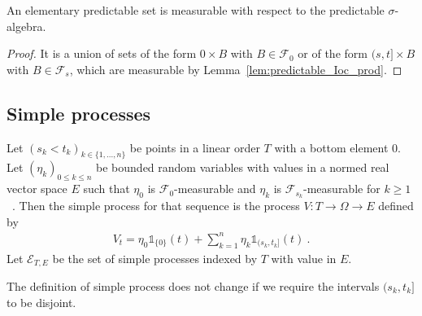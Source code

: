 \begin{lemma}\label{lem:predictableSet_elementaryPredictableSet}
  \leanok
An elementary predictable set is measurable with respect to the predictable $\sigma$-algebra.
\end{lemma}

\begin{proof}
  \leanok
It is a union of sets of the form ${0} \times B$ with $B \in \mathcal{F}_0$ or of the form $(s, t] \times B$ with $B \in \mathcal{F}_s$, which are measurable by Lemma~\ref{lem:predictable_Ioc_prod}.
\end{proof}

\subsection{Simple processes}

\begin{definition}\label{def:simpleProcess}
  \leanok
Let $(s_k < t_k)_{k \in \{1, ..., n\}}$ be points in a linear order $T$ with a bottom element 0.
Let $(\eta_k)_{0 \le k \le n}$ be bounded random variables with values in a normed real vector space $E$ such that $\eta_0$ is $\mathcal{F}_0$-measurable and $\eta_k$ is $\mathcal{F}_{s_k}$-measurable for $k \ge 1$~.
Then the simple process for that sequence is the process $V : T \to \Omega \to E$ defined by
\begin{align*}
  V_t = \eta_0 \mathbb{1}_{\{0\}}(t) + \sum_{k=1}^{n} \eta_k \mathbb{1}_{(s_k, t_k]}(t)
  \: .
\end{align*}
Let $\mathcal{E}_{T, E}$ be the set of simple processes indexed by $T$ with value in $E$.
\end{definition}

\begin{lemma}\label{lem:simpleProcess_admitsDisjointIntervals}
  The definition of simple process does not change if we require the intervals $(s_k, t_k]$ to be disjoint.
\end{lemma}

